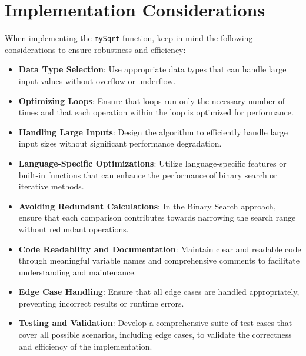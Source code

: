 \section*{Implementation Considerations}

When implementing the \texttt{mySqrt} function, keep in mind the following considerations to ensure robustness and efficiency:

\begin{itemize}
    \item \textbf{Data Type Selection}: Use appropriate data types that can handle large input values without overflow or underflow.
    
    \item \textbf{Optimizing Loops}: Ensure that loops run only the necessary number of times and that each operation within the loop is optimized for performance.
    
    \item \textbf{Handling Large Inputs}: Design the algorithm to efficiently handle large input sizes without significant performance degradation.
    
    \item \textbf{Language-Specific Optimizations}: Utilize language-specific features or built-in functions that can enhance the performance of binary search or iterative methods.
    
    \item \textbf{Avoiding Redundant Calculations}: In the Binary Search approach, ensure that each comparison contributes towards narrowing the search range without redundant operations.
    
    \item \textbf{Code Readability and Documentation}: Maintain clear and readable code through meaningful variable names and comprehensive comments to facilitate understanding and maintenance.
    
    \item \textbf{Edge Case Handling}: Ensure that all edge cases are handled appropriately, preventing incorrect results or runtime errors.
    
    \item \textbf{Testing and Validation}: Develop a comprehensive suite of test cases that cover all possible scenarios, including edge cases, to validate the correctness and efficiency of the implementation.
    

\end{itemize}
